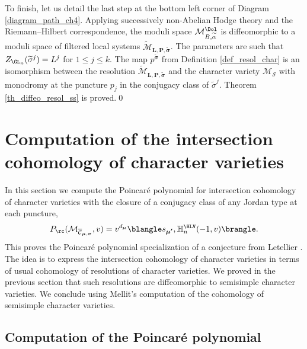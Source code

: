 To finish, let us detail the last step at the bottom left corner of Diagram \eqref{diagram_path_ch4}. Applying successively non-Abelian Hodge theory and the Riemann--Hilbert correspondence, the moduli space $\mathcal{M}_{B,\widetilde{\alpha}}^{\Dol}$ is diffeomorphic to a moduli space of filtered local systems $\widetilde{\mathcal{M}}_{\boldsymbol{L},\boldsymbol{P},\boldsymbol{\widetilde{\sigma}}}$. The parameters are such that $Z_{\GL_n}(\widetilde{\sigma}^j) = L^j$ for $1\le j \le k$. The map $p^{\boldsymbol{\widetilde{\sigma}}}$ from Definition \ref{def_resol_char} is an isomorphism between the resolution $\widetilde{\mathcal{M}}_{\boldsymbol{L},\boldsymbol{P},\boldsymbol{\widetilde{\sigma}}}$ and the character variety $\mathcal{M}_{\boldsymbol{\mathcal{S}}}$ with monodromy at the puncture $p_j$ in the conjugacy class of $\widetilde{\sigma}^j$. Theorem \ref{th_diffeo_resol_ss} is proved.\qed

\section{Computation of the intersection cohomology of character varieties}\label{sect_computation_pc}
In this section we compute the Poincaré polynomial for intersection cohomology of character varieties with the closure of a conjugacy class of any Jordan type at each puncture,
\[
P_{\rc}(\mathcal{M}_{\overline{{\mathcal{C}}}_{\boldsymbol{\mu},\boldsymbol{\sigma}}},v) = v^{d_{\boldsymbol{\mu}}}\blangle s_{\boldsymbol{\mu'}}, \mathbb{H}_n^{\HLV}(-1,v)\brangle.
\]
This proves the Poincaré polynomial specialization of a conjecture from Letellier \cite{Letellier13}. The idea is to express the intersection cohomology of character varieties in terms of usual cohomology of resolutions of character varieties.
We proved in the previous section that such resolutions are diffeomorphic to semisimple character varieties. We conclude using Mellit's computation \cite{Mellit2020} of the cohomology of semisimple character varieties.

\subsection{Computation of the Poincaré polynomial}\label{sect_poincare_comput}


